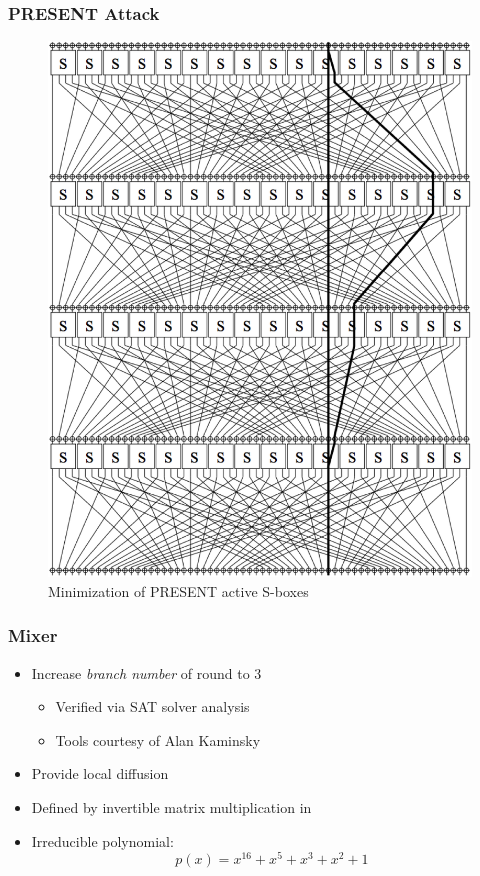 \begin{frame}
\frametitle{PRESENT Attack}
\begin{figure}[ht]
\centering
\includegraphics[height=0.62\textheight]{img/PRESENT_Trail.png}
\caption{Minimization of PRESENT active S-boxes}
\end{figure}
\end{frame}

\begin{frame}
\frametitle{Mixer}
\begin{itemize}
  \item Increase \emph{branch number} of round to 3
  \begin{itemize}
    \item Verified via SAT solver analysis 
    \item Tools courtesy of Alan Kaminsky
  \end{itemize}
  \item Provide local diffusion
  \item Defined by invertible matrix multiplication in \gfsixteen
  \item Irreducible polynomial:
  \begin{equation*}
  p(x) = x^{16} + x^5 + x^3 + x^2 + 1
  \end{equation*}
\end{itemize}
\end{frame}

